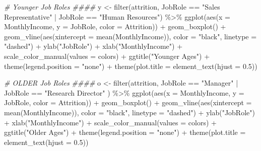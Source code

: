 \documentclass[
]{article}
\newenvironment{Shaded}{\begin{snugshade}}{\end{snugshade}}
\newcommand{\AttributeTok}[1]{\textcolor[rgb]{0.77,0.63,0.00}{#1}}
\newcommand{\CommentTok}[1]{\textcolor[rgb]{0.56,0.35,0.01}{\textit{#1}}}
\newcommand{\FloatTok}[1]{\textcolor[rgb]{0.00,0.00,0.81}{#1}}
\newcommand{\FunctionTok}[1]{\textcolor[rgb]{0.00,0.00,0.00}{#1}}
\newcommand{\NormalTok}[1]{#1}
\newcommand{\OtherTok}[1]{\textcolor[rgb]{0.56,0.35,0.01}{#1}}
\newcommand{\SpecialCharTok}[1]{\textcolor[rgb]{0.00,0.00,0.00}{#1}}
\newcommand{\StringTok}[1]{\textcolor[rgb]{0.31,0.60,0.02}{#1}}
\begin{document}
\begin{Shaded}
\begin{Highlighting}[]
\CommentTok{\# Younger Job Roles \#\#\#\#}
\NormalTok{y }\OtherTok{\textless{}{-}} \FunctionTok{filter}\NormalTok{(attrition, JobRole }\SpecialCharTok{==} \StringTok{"Sales Representative"} \SpecialCharTok{|}\NormalTok{ JobRole }\SpecialCharTok{==} \StringTok{"Human Resources"}\NormalTok{) }\SpecialCharTok{\%\textgreater{}\%}
  \FunctionTok{ggplot}\NormalTok{(}\FunctionTok{aes}\NormalTok{(}\AttributeTok{x =}\NormalTok{ MonthlyIncome, }\AttributeTok{y =}\NormalTok{ JobRole, }\AttributeTok{color =}\NormalTok{ Attrition)) }\SpecialCharTok{+}
  \FunctionTok{geom\_boxplot}\NormalTok{() }\SpecialCharTok{+}
  \FunctionTok{geom\_vline}\NormalTok{(}\FunctionTok{aes}\NormalTok{(}\AttributeTok{xintercept =} \FunctionTok{mean}\NormalTok{(MonthlyIncome)), }\AttributeTok{color =} \StringTok{"black"}\NormalTok{, }\AttributeTok{linetype =} \StringTok{"dashed"}\NormalTok{) }\SpecialCharTok{+}
  \FunctionTok{ylab}\NormalTok{(}\StringTok{"JobRole"}\NormalTok{) }\SpecialCharTok{+}
  \FunctionTok{xlab}\NormalTok{(}\StringTok{"MonthlyIncome"}\NormalTok{) }\SpecialCharTok{+}
  \FunctionTok{scale\_color\_manual}\NormalTok{(}\AttributeTok{values =}\NormalTok{ colors) }\SpecialCharTok{+}
  \FunctionTok{ggtitle}\NormalTok{(}\StringTok{"Younger Ages"}\NormalTok{) }\SpecialCharTok{+}
  \FunctionTok{theme}\NormalTok{(}\AttributeTok{legend.position =} \StringTok{"none"}\NormalTok{) }\SpecialCharTok{+}
  \FunctionTok{theme}\NormalTok{(}\AttributeTok{plot.title =} \FunctionTok{element\_text}\NormalTok{(}\AttributeTok{hjust =} \FloatTok{0.5}\NormalTok{)) }
  

\CommentTok{\# OLDER Job Roles \#\#\#\#}
\NormalTok{o }\OtherTok{\textless{}{-}} \FunctionTok{filter}\NormalTok{(attrition, JobRole }\SpecialCharTok{==} \StringTok{"Manager"} \SpecialCharTok{|}\NormalTok{ JobRole }\SpecialCharTok{==} \StringTok{"Research Director"}\NormalTok{ ) }\SpecialCharTok{\%\textgreater{}\%}
  \FunctionTok{ggplot}\NormalTok{(}\FunctionTok{aes}\NormalTok{(}\AttributeTok{x =}\NormalTok{ MonthlyIncome, }\AttributeTok{y =}\NormalTok{ JobRole, }\AttributeTok{color =}\NormalTok{ Attrition)) }\SpecialCharTok{+}
  \FunctionTok{geom\_boxplot}\NormalTok{() }\SpecialCharTok{+}
  \FunctionTok{geom\_vline}\NormalTok{(}\FunctionTok{aes}\NormalTok{(}\AttributeTok{xintercept =} \FunctionTok{mean}\NormalTok{(MonthlyIncome)), }\AttributeTok{color =} \StringTok{"black"}\NormalTok{, }\AttributeTok{linetype =} \StringTok{"dashed"}\NormalTok{) }\SpecialCharTok{+}
  \FunctionTok{ylab}\NormalTok{(}\StringTok{"JobRole"}\NormalTok{) }\SpecialCharTok{+}
  \FunctionTok{xlab}\NormalTok{(}\StringTok{"MonthlyIncome"}\NormalTok{) }\SpecialCharTok{+}
  \FunctionTok{scale\_color\_manual}\NormalTok{(}\AttributeTok{values =}\NormalTok{ colors) }\SpecialCharTok{+}
  \FunctionTok{ggtitle}\NormalTok{(}\StringTok{"Older Ages"}\NormalTok{) }\SpecialCharTok{+}
  \FunctionTok{theme}\NormalTok{(}\AttributeTok{legend.position =} \StringTok{"none"}\NormalTok{) }\SpecialCharTok{+}
  \FunctionTok{theme}\NormalTok{(}\AttributeTok{plot.title =} \FunctionTok{element\_text}\NormalTok{(}\AttributeTok{hjust =} \FloatTok{0.5}\NormalTok{)) }



\end{Highlighting}
\end{Shaded}
\end{document}
